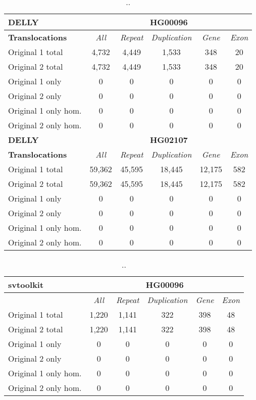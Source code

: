 \begin{table}[htb]
\caption{ .. }
\begin{center}
\begin{tabular}{|l|c||c|c|c|c|}
\hline
{\bf DELLY} & \multicolumn{5}{|c|}{\bf HG00096} \\
\hline
\cline{2-6}
{\bf Translocations} & {\it All} & {\it Repeat} & {\it Duplication} & {\it Gene} & {\it Exon} \\
\hline
Original 1 total & 4,732 & 4,449 & 1,533 & 348 & 20\\ 
\hline
Original 2 total & 4,732 & 4,449 & 1,533 & 348 & 20\\ 
\hline
Original 1 only & 0 & 0 & 0 & 0 & 0\\ 
\hline
Original 2 only & 0 & 0 & 0 & 0 & 0\\ 
\hline
Original 1 only hom. & 0 & 0 & 0 & 0 & 0\\ 
\hline
Original 2 only hom. & 0 & 0 & 0 & 0 & 0\\ 
\hline
\hline
{\bf DELLY} & \multicolumn{5}{|c|}{\bf HG02107} \\
\hline
\cline{2-6}
{\bf Translocations} & {\it All} & {\it Repeat} & {\it Duplication} & {\it Gene} & {\it Exon} \\
\hline
Original 1 total & 59,362 & 45,595 & 18,445 & 12,175 & 582 \\
\hline
Original 2 total & 59,362 & 45,595 & 18,445 & 12,175 & 582 \\
\hline
Original 1 only & 0 & 0 & 0 & 0 & 0\\ 
\hline
Original 2 only & 0 & 0 & 0 & 0 & 0\\ 
\hline
Original 1 only hom. & 0 & 0 & 0 & 0 & 0\\ 
\hline
Original 2 only hom. & 0 & 0 & 0 & 0 & 0\\ 
\hline
\end{tabular}
\end{center}
\label{tab:orig-vs-orig2-delly-trans}
\end{table}

\begin{table}[htb]
\caption{ .. }
\begin{center}
\begin{tabular}{|l|c||c|c|c|c|}
\hline
{\bf svtoolkit} & \multicolumn{5}{|c|}{\bf HG00096} \\
\hline
\cline{2-6}
{\bf} & {\it All} & {\it Repeat} & {\it Duplication} & {\it Gene} & {\it Exon} \\
\hline
Original 1 total & 1,220 & 1,141 & 322 & 398 & 48 \\
\hline
Original 2 total & 1,220 & 1,141 & 322 & 398 & 48 \\
\hline
Original 1 only & 0 & 0 & 0 & 0 & 0\\ 
\hline
Original 2 only & 0 & 0 & 0 & 0 & 0\\
\hline
Original 1 only hom. & 0 & 0 & 0 & 0 & 0\\ 
\hline
Original 2 only hom. & 0 & 0 & 0 & 0 & 0\\  
\hline
\end{tabular}
\end{center}
\label{tab:orig-vs-orig2-svtoolkit}
\end{table}
